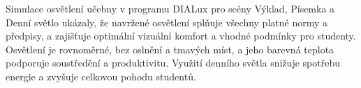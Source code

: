 
Simulace osvětlení učebny v programu DIALux pro scény Výklad, Písemka a Denní světlo ukázaly, že navržené osvětlení
splňuje všechny platné normy a předpisy, a zajišťuje optimální vizuální komfort a vhodné podmínky pro studenty.
Osvětlení je rovnoměrné, bez oslnění a tmavých míst, a jeho barevná teplota podporuje soustředění a produktivitu.
Využití denního světla snižuje spotřebu energie a zvyšuje celkovou pohodu studentů.





